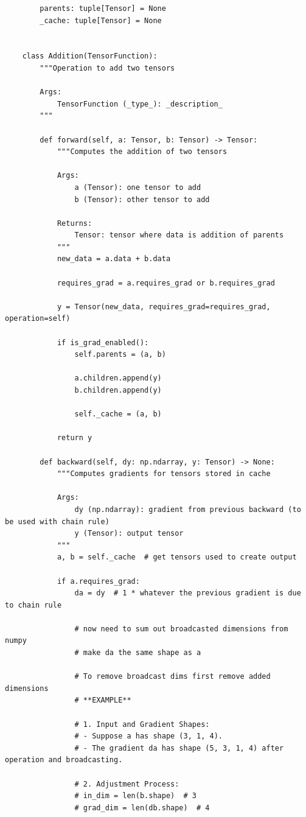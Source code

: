 \documentclass{article}
\begin{document}
\begin{verbatim}
        parents: tuple[Tensor] = None
        _cache: tuple[Tensor] = None


    class Addition(TensorFunction):
        """Operation to add two tensors

        Args:
            TensorFunction (_type_): _description_
        """

        def forward(self, a: Tensor, b: Tensor) -> Tensor:
            """Computes the addition of two tensors

            Args:
                a (Tensor): one tensor to add
                b (Tensor): other tensor to add

            Returns:
                Tensor: tensor where data is addition of parents
            """
            new_data = a.data + b.data

            requires_grad = a.requires_grad or b.requires_grad

            y = Tensor(new_data, requires_grad=requires_grad, operation=self)

            if is_grad_enabled():
                self.parents = (a, b)

                a.children.append(y)
                b.children.append(y)

                self._cache = (a, b)

            return y

        def backward(self, dy: np.ndarray, y: Tensor) -> None:
            """Computes gradients for tensors stored in cache

            Args:
                dy (np.ndarray): gradient from previous backward (to be used with chain rule)
                y (Tensor): output tensor
            """
            a, b = self._cache  # get tensors used to create output

            if a.requires_grad:
                da = dy  # 1 * whatever the previous gradient is due to chain rule

                # now need to sum out broadcasted dimensions from numpy
                # make da the same shape as a

                # To remove broadcast dims first remove added dimensions
                # **EXAMPLE**

                # 1. Input and Gradient Shapes:
                # - Suppose a has shape (3, 1, 4).
                # - The gradient da has shape (5, 3, 1, 4) after operation and broadcasting.

                # 2. Adjustment Process:
                # in_dim = len(b.shape)  # 3
                # grad_dim = len(db.shape)  # 4


\end{verbatim}
\end{document}
